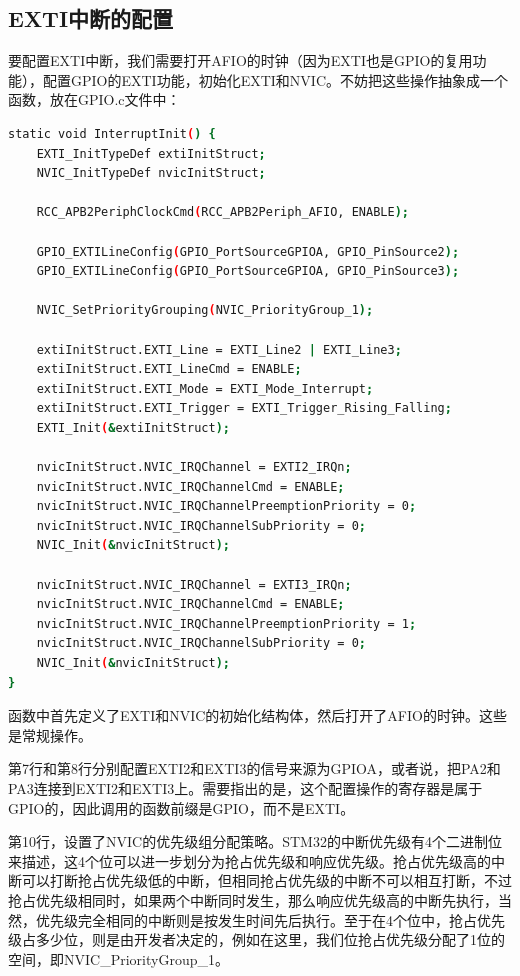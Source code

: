 	\subsection{EXTI中断的配置}
		要配置EXTI中断，我们需要打开AFIO的时钟（因为EXTI也是GPIO的复用功能），配置GPIO的EXTI功能，初始化EXTI和NVIC。不妨把这些操作抽象成一个函数，放在GPIO.c文件中：
		\par 
		\begin{lstlisting}[language=bash, style=customStyleC, caption=EXTI配置]
static void InterruptInit() {
	EXTI_InitTypeDef extiInitStruct;
	NVIC_InitTypeDef nvicInitStruct;
	
	RCC_APB2PeriphClockCmd(RCC_APB2Periph_AFIO, ENABLE);
	
	GPIO_EXTILineConfig(GPIO_PortSourceGPIOA, GPIO_PinSource2);
	GPIO_EXTILineConfig(GPIO_PortSourceGPIOA, GPIO_PinSource3);
	
	NVIC_SetPriorityGrouping(NVIC_PriorityGroup_1);
	
	extiInitStruct.EXTI_Line = EXTI_Line2 | EXTI_Line3;
	extiInitStruct.EXTI_LineCmd = ENABLE;
	extiInitStruct.EXTI_Mode = EXTI_Mode_Interrupt;
	extiInitStruct.EXTI_Trigger = EXTI_Trigger_Rising_Falling;
	EXTI_Init(&extiInitStruct);
	
	nvicInitStruct.NVIC_IRQChannel = EXTI2_IRQn;
	nvicInitStruct.NVIC_IRQChannelCmd = ENABLE;
	nvicInitStruct.NVIC_IRQChannelPreemptionPriority = 0;
	nvicInitStruct.NVIC_IRQChannelSubPriority = 0;
	NVIC_Init(&nvicInitStruct);
	
	nvicInitStruct.NVIC_IRQChannel = EXTI3_IRQn;
	nvicInitStruct.NVIC_IRQChannelCmd = ENABLE;
	nvicInitStruct.NVIC_IRQChannelPreemptionPriority = 1;
	nvicInitStruct.NVIC_IRQChannelSubPriority = 0;
	NVIC_Init(&nvicInitStruct);
}
		\end{lstlisting}
		\par 
		函数中首先定义了EXTI和NVIC的初始化结构体，然后打开了AFIO的时钟。这些是常规操作。
		\par 
		第7行和第8行分别配置EXTI2和EXTI3的信号来源为GPIOA，或者说，把PA2和PA3连接到EXTI2和EXTI3上。需要指出的是，这个配置操作的寄存器是属于GPIO的，因此调用的函数前缀是GPIO，而不是EXTI。
		\par 
		第10行，设置了NVIC的优先级组分配策略。STM32的中断优先级有4个二进制位来描述，这4个位可以进一步划分为抢占优先级和响应优先级。抢占优先级高的中断可以打断抢占优先级低的中断，但相同抢占优先级的中断不可以相互打断，不过抢占优先级相同时，如果两个中断同时发生，那么响应优先级高的中断先执行，当然，优先级完全相同的中断则是按发生时间先后执行。至于在4个位中，抢占优先级占多少位，则是由开发者决定的，例如在这里，我们位抢占优先级分配了1位的空间，即NVIC\_PriorityGroup\_1。
